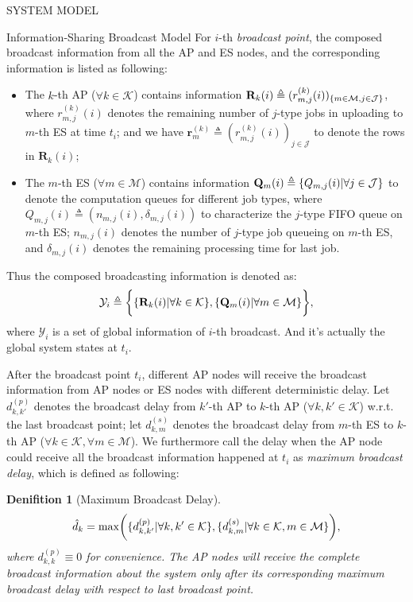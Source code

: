 \documentclass[10pt, conference, letterpaper]{IEEEtran}
\newtheorem{definition}{Denifition}
\newcommand{\mat}{\mathbf}
\newcommand{\define}{\triangleq}
\renewcommand{\vec}{\mathbf}
\DeclarePairedDelimiter{\set}{\{}{\}}
\DeclarePairedDelimiter{\Paren}{\bigg(}{\bigg)}
\DeclarePairedDelimiter{\Brace}{\bigg\{}{\bigg\}}
\newcommand{\apSet}{\mathcal{K}}
\newcommand{\esSet}{\mathcal{M}}
\newcommand{\jSpace}{\mathcal{J}}
\newcommand{\Obsv}{\mathcal{Y}}
\begin{document}
\begin{section}{SYSTEM MODEL}
\begin{subsection}{Information-Sharing Broadcast Model}
            For $i$-th \emph{broadcast point}, the composed broadcast information from all the AP and ES nodes, and the corresponding information is listed as following:
            \begin{itemize}
                \item The $k$-th AP ($\forall k\in\apSet$) contains information $\mat{R}_k(i) \define (r^{(k)}_{m,j}(i))_{\set{m\in\esSet,j\in\jSpace}}$, where $r^{(k)}_{m,j}(i)$ denotes the remaining number of $j$-type jobs in uploading to $m$-th ES at time $t_i$; and we have $\vec{r}^{(k)}_{m} \define (r^{(k)}_{m,j}(i))_{j\in\jSpace}$ to denote the rows in $\vec{R}_k(i)$; %
                \item The $m$-th ES ($\forall m\in\esSet$) contains information $\vec{Q}_m(i) \define \set{Q_{m,j}(i)|\forall j\in\jSpace}$ to denote the computation queues for different job types, where $Q_{m,j}(i) \define (n_{m,j}(i), \delta_{m,j}(i))$ to characterize the $j$-type FIFO queue on $m$-th ES; $n_{m,j}(i)$ denotes the number of $j$-type job queueing on $m$-th ES, and $\delta_{m,j}(i)$ denotes the remaining processing time for last job.
            \end{itemize}
            Thus the composed broadcasting information is denoted as:
            \begin{align}
                \Obsv_i \define
                        \Brace{
                            \set{\mat{R}_{k}(i)|\forall k\in\apSet},
                            \set{\vec{Q}_m(i)|\forall m\in\esSet}
                        },
            \end{align}
            where $\Obsv_i$ is a set of global information of $i$-th broadcast. And it's actually the global system states at $t_i$.

            After the broadcast point $t_i$, different AP nodes will receive the broadcast information from AP nodes or ES nodes with different deterministic delay.
            Let $d^{(p)}_{k,k'}$ denotes the broadcast delay from $k'$-th AP to $k$-th AP ($\forall k,k'\in\apSet$) w.r.t. the last broadcast point; let $d^{(s)}_{k,m}$ denotes the broadcast delay from $m$-th ES to $k$-th AP ($\forall k\in\apSet,\forall m\in\esSet$). We furthermore call the delay when the AP node could receive all the broadcast information happened at $t_i$ as \emph{maximum broadcast delay}, which is defined as following:
            \begin{definition}[Maximum Broadcast Delay]
                \begin{align}
                    \hat{d}_k = \max \Paren{\set{d^{(p)}_{k,k'}|\forall k,k'\in\apSet}, \set{d^{(s)}_{k,m}|\forall k\in\apSet,m\in\esSet}},
                \end{align}
                where $d^{(p)}_{k,k} \equiv 0$ for convenience. The AP nodes will receive the complete broadcast information about the system only after its corresponding maximum broadcast delay with respect to last broadcast point.
            \end{definition}


\end{subsection}
\end{section}
\end{document}
